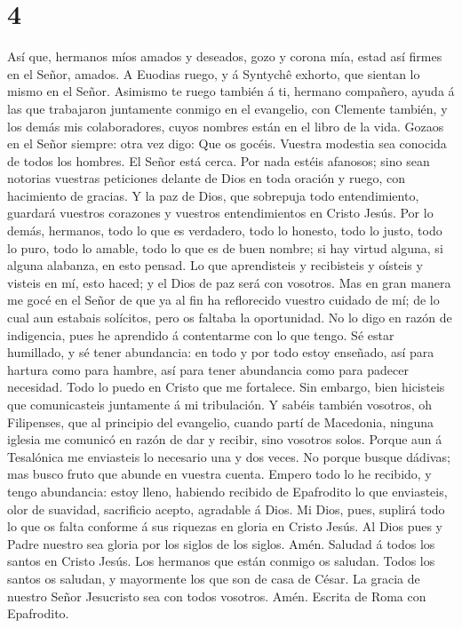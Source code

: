 \hypertarget{section-3}{%
\section{4}\label{section-3}}

 Así que, hermanos míos amados y deseados, gozo y corona
mía, estad así firmes en el Señor, amados.  A Euodias ruego,
y á Syntychê exhorto, que sientan lo mismo en el Señor. 
Asimismo te ruego también á ti, hermano compañero, ayuda á las que
trabajaron juntamente conmigo en el evangelio, con Clemente también, y
los demás mis colaboradores, cuyos nombres están en el libro de la vida.
 Gozaos en el Señor siempre: otra vez digo: Que os gocéis.
 Vuestra modestia sea conocida de todos los hombres. El
Señor está cerca.  Por nada estéis afanosos; sino sean
notorias vuestras peticiones delante de Dios en toda oración y ruego,
con hacimiento de gracias.  Y la paz de Dios, que sobrepuja
todo entendimiento, guardará vuestros corazones y vuestros
entendimientos en Cristo Jesús.  Por lo demás, hermanos,
todo lo que es verdadero, todo lo honesto, todo lo justo, todo lo puro,
todo lo amable, todo lo que es de buen nombre; si hay virtud alguna, si
alguna alabanza, en esto pensad.  Lo que aprendisteis y
recibisteis y oísteis y visteis en mí, esto haced; y el Dios de paz será
con vosotros.  Mas en gran manera me gocé en el Señor de
que ya al fin ha reflorecido vuestro cuidado de mí; de lo cual aun
estabais solícitos, pero os faltaba la oportunidad.  No lo
digo en razón de indigencia, pues he aprendido á contentarme con lo que
tengo.  Sé estar humillado, y sé tener abundancia: en todo
y por todo estoy enseñado, así para hartura como para hambre, así para
tener abundancia como para padecer necesidad.  Todo lo
puedo en Cristo que me fortalece.  Sin embargo, bien
hicisteis que comunicasteis juntamente á mi tribulación.  Y
sabéis también vosotros, oh Filipenses, que al principio del evangelio,
cuando partí de Macedonia, ninguna iglesia me comunicó en razón de dar y
recibir, sino vosotros solos.  Porque aun á Tesalónica me
enviasteis lo necesario una y dos veces.  No porque busque
dádivas; mas busco fruto que abunde en vuestra cuenta. 
Empero todo lo he recibido, y tengo abundancia: estoy lleno, habiendo
recibido de Epafrodito lo que enviasteis, olor de suavidad, sacrificio
acepto, agradable á Dios.  Mi Dios, pues, suplirá todo lo
que os falta conforme á sus riquezas en gloria en Cristo Jesús.
 Al Dios pues y Padre nuestro sea gloria por los siglos de
los siglos. Amén.  Saludad á todos los santos en Cristo
Jesús. Los hermanos que están conmigo os saludan.  Todos
los santos os saludan, y mayormente los que son de casa de César.
 La gracia de nuestro Señor Jesucristo sea con todos
vosotros. Amén. Escrita de Roma con Epafrodito.
